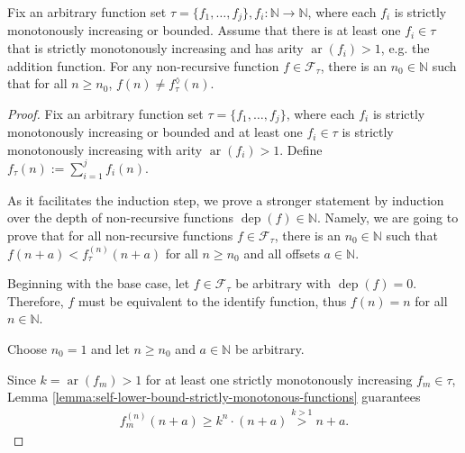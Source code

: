 \begin{theorem}
	\label{theorem:recursive-completion-not-non-recursive-expressible}
	Fix an arbitrary function set $\tau=\{f_1,\dots,f_j\},f_i:\mathbb{N}\to\mathbb{N}$, where each $f_i$ is strictly monotonously increasing or bounded. 
	Assume that there is at least one $f_i\in\tau$ that is strictly monotonously increasing and has arity $\operatorname{ar}(f_i)>1$, e.g. the addition function.
	For any non-recursive function $f\in\mathcal{F}_{\tau}$, there is an $n_0\in\mathbb{N}$ such that for all $n\geq n_0$, $f(n)\neq f_{\tau}^{\lozenge}(n)$.
\end{theorem}
\begin{proof}
	Fix an arbitrary function set $\tau=\{f_1,\dots,f_j\}$, where each $f_i$ is strictly monotonously increasing or bounded and at least one $f_i\in\tau$ is strictly monotonously increasing with arity $\operatorname{ar}(f_i)>1$. 
	Define $f_\tau(n):=\sum_{i=1}^{j}f_i(n)$.
	
	As it facilitates the induction step, we prove a stronger statement by induction over the depth of non-recursive functions $\operatorname{dep}(f)\in\mathbb{N}$.
	Namely, we are going to prove that for all non-recursive functions $f\in\mathcal{F}_{\tau}$, there is an $n_0\in\mathbb{N}$ such that $f(n+a)<f_{\tau}^{(n)}(n+a)$ for all $n\geq n_0$ and all offsets $a\in\mathbb{N}$.
	
	Beginning with the base case, let $f\in\mathcal{F}_{\tau}$ be arbitrary with $\operatorname{dep}(f)=0$.
	Therefore, $f$ must be equivalent to the identify function, thus $f(n)=n$ for all $n\in\mathbb{N}$.
	
	Choose $n_0=1$ and let $n\geq n_0$ and $a\in\mathbb{N}$ be arbitrary.
	
	Since $k=\operatorname{ar}(f_m)>1$ for at least one strictly monotonously increasing $f_m\in\tau$, Lemma \ref{lemma:self-lower-bound-strictly-monotonous-functions} guarantees
	\begin{align}
		\label{eq:theorem:recursive-completion-not-non-recursive-expressible-self-lower-bound}
		f_m^{(n)}(n+a) \geq k^n\cdot (n+a) \overset{k>1}{>} n+a.
	\end{align}
	
	

\end{proof}

